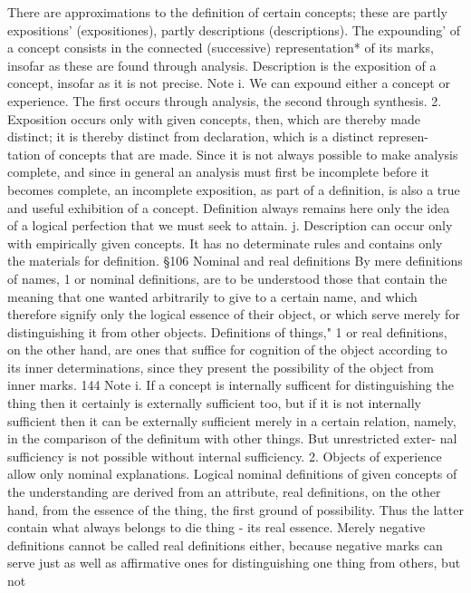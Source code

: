 {There are approximations to the definition of certain concepts; these
are partly expositions' (expositiones), partly descriptions (descriptions).
The expounding' of a concept consists in the connected (successive)
representation* of its marks, insofar as these are found through analysis.
Description is the exposition of a concept, insofar as it is not precise.
Note i. We can expound either a concept or experience. The first occurs through
analysis, the second through synthesis.
2. Exposition occurs only with given concepts, then, which are thereby made
distinct; it is thereby distinct from declaration, which is a distinct represen-
tation of concepts that are made.
Since it is not always possible to make analysis complete, and since in
general an analysis must first be incomplete before it becomes complete,
an incomplete exposition, as part of a definition, is also a true and useful
exhibition of a concept. Definition always remains here only the idea of a
logical perfection that we must seek to attain.
j. Description can occur only with empirically given concepts. It has no
determinate rules and contains only the materials for definition.
§106
Nominal and real definitions
By mere definitions of names, 1 or nominal definitions, are to be understood
those that contain the meaning that one wanted arbitrarily to give to a
certain name, and which therefore signify only the logical essence of their
object, or which serve merely for distinguishing it from other objects.
Definitions of things," 1 or real definitions, on the other hand, are ones that
suffice for cognition of the object according to its inner determinations,
since they present the possibility of the object from inner marks.
144
Note i. If a concept is internally sufficent for distinguishing the thing then it
certainly is externally sufficient too, but if it is not internally sufficient
then it can be externally sufficient merely in a certain relation, namely, in
the comparison of the definitum with other things. But unrestricted exter-
nal sufficiency is not possible without internal sufficiency.
2. Objects of experience allow only nominal explanations. Logical nominal
definitions of given concepts of the understanding are derived from an
attribute, real definitions, on the other hand, from the essence of the
thing, the first ground of possibility. Thus the latter contain what always
belongs to die thing - its real essence. Merely negative definitions cannot
be called real definitions either, because negative marks can serve just as
well as affirmative ones for distinguishing one thing from others, but not
}
